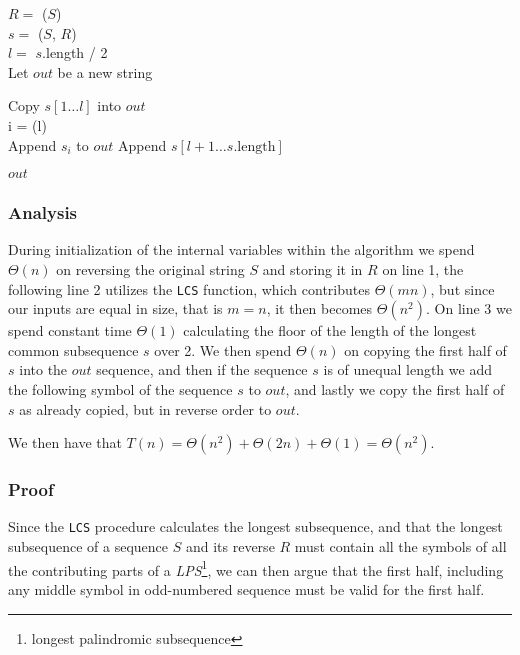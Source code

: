 \documentclass[11pt,english]{article}
\begin{document}
\begin{algorithm}
	
	\BlankLine
	
	$R =$ \Reverse($S$)\\
	$s =$ \LCS($S$, $R$)\\
	$l =$ $s$.length / 2\\
	Let $out$ be a new string
	
	Copy $s[1 \dots l]$ into $out$\\
	{
		i = \Ceil(l)\\
		Append $s_i$ to $out$
	}
	Append $s[l+1 \dots s\text{.length}]$
	
	\Return $out$	
\end{algorithm}

\subsubsection*{Analysis}
During initialization of the internal variables within the algorithm we spend
$\Theta(n)$ on reversing the original string $S$ and storing it in $R$ on line
1, the following line 2 utilizes the \texttt{LCS} function, which contributes
$\Theta(mn)$, but since our inputs are equal in size, that is $m = n$, it then
becomes $\Theta(n^2)$. On line 3 we spend constant time $\Theta(1)$
calculating the floor of the length of the longest common subsequence $s$ over
2. We then spend $\Theta(n)$ on copying the first half of $s$ into the $out$
sequence, and then if the sequence $s$ is of unequal length we add the
following symbol of the sequence $s$ to $out$, and lastly we copy the first
half of $s$ as already copied, but in reverse order to $out$.

We then have that $T(n) = \Theta(n^2) + \Theta(2n) + \Theta(1) = \Theta(n^2)$.

\subsubsection*{Proof}
Since the \texttt{LCS} procedure calculates the longest subsequence, and that
the longest subsequence of a sequence $S$ and its reverse $R$ must contain all
the symbols of all the contributing parts of a \textit{LPS}\footnote{longest
palindromic subsequence}, we can then argue that the first half, including any
middle symbol in odd-numbered sequence must be valid for the first half.
\end{document}
